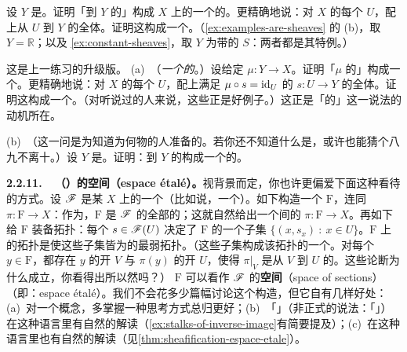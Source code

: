 \begin{exercise}[「\trMorphism{}可粘」]\label{ex:morphisms-glue}
设 $Y$ 是\trTopologicalSpace。证明「到 $Y$ 的\trContinuousMap{}」构成 $X$ 上的一个\trSetsWord{}的\trSheaf。更精确地说：对 $X$ 的每个\trOpenSet{} $U$，配上从 $U$ 到 $Y$ 的\trContinuousMap{}全体。证明这构成一个\trSheaf。（\cref{ex:examples-are-sheaves} 的 (b)，取 $Y=\mathbb{R}$；以及 \cref{ex:constant-sheaves}，取 $Y$ 为带\trDiscreteTopology{}的 $S$：两者都是其特例。）
\end{exercise}

\begin{exercise}\label{ex:sections-of-a-map}
这是上一练习的升级版。
(a)~（\emph{一个\trMap{}的\trSection\trSheaf}。）设给定\trContinuousMap{} $\mu\colon Y\to X$。证明「$\mu$ 的\trSection」构成一个\trSheaf。更精确地说：对 $X$ 的每个\trOpenSet{} $U$，配上满足 $\mu\circ s=\mathrm{id}_U$ 的\trContinuousMap{} $s\colon U\to Y$ 的全体。证明这构成一个\trSheaf。（对听说过\trVectorBundle{}的人来说，这些正是好例子。）这正是「\trSheaf{}的\trSection」这一说法的动机所在。

(b)~（这一问是为知道\trTopologicalGroup{}为何物的人准备的。若你还不知道什么是\trTopologicalGroup，或许也能猜个八九不离十。）设 $Y$ 是\trTopologicalGroup。证明：到 $Y$ 的\trContinuousMap{}构成一个\emph{\trGroup}的\trSheaf。
\end{exercise}

\textbf{2.2.11.\ \hard\ （\trPresheaf）\trSheaf{}的\trSection{}空间（espace étalé）。}\quad 视背景而定，你也许更偏爱下面这种看待\trSheaf{}的方式。设 $\mathscr{F}$ 是某\trTopologicalSpace{} $X$ 上的一个\trSetsWord\trPresheaf（比如说，一个\trSheaf）。如下构造一个\trTopologicalSpace{} $\mathrm{F}$，连同\trContinuousMap{} $\pi\colon \mathrm{F}\to X$：作为\trSet，$\mathrm{F}$ 是 $\mathscr{F}$ 的全部\trStalk{}的\trDisjointUnion；这就自然给出一个\trSetsWord{}间的\trMap{} $\pi\colon \mathrm{F}\to X$。再如下给 $\mathrm{F}$ 装备拓扑：每个 $s\in\mathscr{F}(U)$ 决定了 $\mathrm{F}$ 的一个子集 $\{(x,s_x)\ :\ x\in U\}$。$\mathrm{F}$ 上的拓扑是使这些子集皆为\trOpenSet{}的最弱拓扑。（这些子集构成该拓扑的一个\trBase。对每个 $y\in\mathrm{F}$，都存在 $y$ 的开\trNeighborhood{} $V$ 与 $\pi(y)$ 的开\trNeighborhood{} $U$，使得 $\pi|_V$ 是从 $V$ 到 $U$ 的\trHomeomorphism{}。这些论断为什么成立，你看得出所以然吗？）\trTopologicalSpace{} $\mathrm{F}$ 可以看作 $\mathscr{F}$ 的\textbf{\trSection{}空间}（space of sections）（即\trEspaceEtale：espace étalé）。我们不会花多少篇幅讨论这个构造，但它自有几样好处：(a)~对一个概念，多掌握一种思考方式总归更好；(b)~「\trInverseImage」（非正式的说法：「\trPullback」）在这种语言里有自然的解读（\cref{ex:stalks-of-inverse-image}有简要提及）；(c)~\trSheafification{}在这种语言里也有自然的解读（见\cref{thm:sheafification-espace-etale}）。

